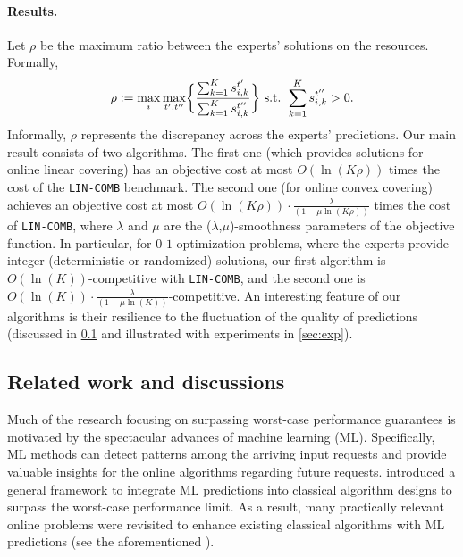 \paragraph{Results.} Let $\rho$ be the maximum ratio between the experts' solutions on the resources. Formally,
\[
	\rho := \max_{i} \max_{t',t''} \biggl\{\frac{\sum_{k=1}^{K} s_{i,k}^{t'}}{\sum_{k=1}^{K} s_{i,k}^{t''}} \biggr\}  \textnormal{ s.t. } \sum_{k=1}^{K} s_{i,k}^{t''} > 0.
\]
Informally, $\rho$ represents the discrepancy across the experts' predictions.
Our main result consists of two algorithms. The first one (which provides solutions for online linear covering) has an objective cost at most $O(\ln(K\rho))$ times the cost of the \texttt{LIN-COMB} benchmark. The second one (for online convex covering) achieves an objective cost at most $O(\ln(K\rho)) \cdot \frac{\lambda}{(1-\mu\ln(K\rho))}$ times the cost of \texttt{LIN-COMB}, where $\lambda$ and $\mu$ are the ($\lambda$,$\mu$)-smoothness parameters of the objective function.
In particular, for $0$-$1$ optimization problems, where the experts provide integer (deterministic or randomized) solutions, our first algorithm is $O(\ln(K))$-competitive with \texttt{LIN-COMB}, and the second one is $O(\ln(K)) \cdot \frac{\lambda}{(1-\mu\ln(K))}$-competitive.
An interesting feature of our algorithms is their resilience to the fluctuation of the quality of predictions (discussed in \cref{subsec:related-works} and illustrated with experiments in \cref{sec:exp}).

\subsection{Related work and discussions} \label{subsec:related-works}

Much of the research focusing on surpassing worst-case performance guarantees is motivated by the spectacular advances of machine learning (ML). Specifically, ML methods can detect patterns among the arriving input requests and provide valuable insights for the online algorithms regarding future requests. \cite{LykourisVassilvtiskii18:Competitive-caching} introduced a general framework to integrate ML predictions into classical algorithm designs to surpass the worst-case performance limit.
As a result, many practically relevant online problems were revisited to enhance existing classical algorithms with ML predictions (see the aforementioned \cite{LattanziLavastida20:Online-scheduling,Mitzenmacher20:Scheduling-with,LykourisVassilvtiskii18:Competitive-caching,Rohatgi20:Near-optimal-bounds,AntoniadisCoester20:Online-metric,GollapudiPanigrahi19:Online-algorithms,KumarPurohit18:Improving-online,AngelopoulosDurr20:Online-Computation,HsuIndyk19:Learning-Based-Frequency,KraskaBeutel18:The-case-for-learned,Mitzenmacher18:A-model-for-learned,AntoniosEtAll23:mixing-predictions-metric-algorithms}).

